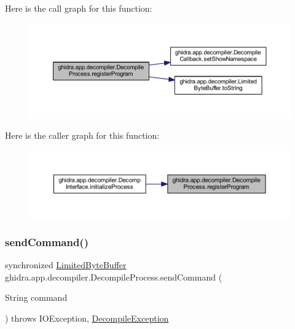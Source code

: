 Here is the call graph for this function\+:
\nopagebreak
\begin{figure}[H]
\begin{center}
\leavevmode
\includegraphics[width=350pt]{classghidra_1_1app_1_1decompiler_1_1_decompile_process_a40583f5d5b24e837f7837ccab1510330_cgraph}
\end{center}
\end{figure}
Here is the caller graph for this function\+:
\nopagebreak
\begin{figure}[H]
\begin{center}
\leavevmode
\includegraphics[width=350pt]{classghidra_1_1app_1_1decompiler_1_1_decompile_process_a40583f5d5b24e837f7837ccab1510330_icgraph}
\end{center}
\end{figure}
\mbox{\label{classghidra_1_1app_1_1decompiler_1_1_decompile_process_a36fc409f22c26d36509fc3c06a8b9f93}} 
\subsubsection{\texorpdfstring{sendCommand()}{sendCommand()}}
{\footnotesize\ttfamily synchronized \mbox{\hyperlink{classghidra_1_1app_1_1decompiler_1_1_limited_byte_buffer}{Limited\+Byte\+Buffer}} ghidra.\+app.\+decompiler.\+Decompile\+Process.\+send\+Command (\begin{DoxyParamCaption}\item[{String}]{command }\end{DoxyParamCaption}) throws I\+O\+Exception, \mbox{\hyperlink{classghidra_1_1app_1_1decompiler_1_1_decompile_exception}{Decompile\+Exception}}\hspace{0.3cm}{\ttfamily [inline]}}

